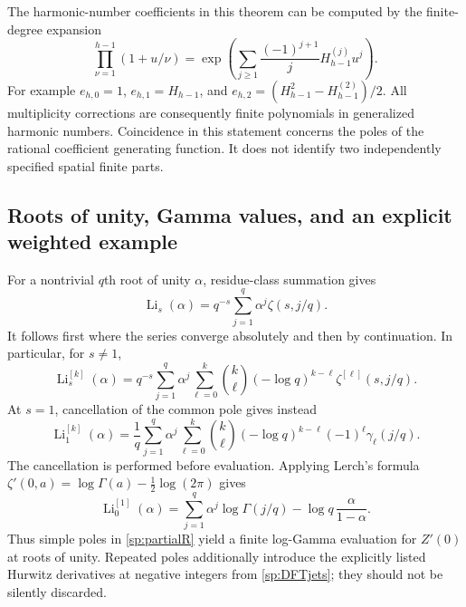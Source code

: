 \documentclass[11pt,a4paper]{article}
\theoremstyle{definition}
\theoremstyle{remark}
\numberwithin{equation}{section}
\begin{document}
The harmonic-number coefficients in this theorem can be computed by
the finite-degree expansion
\begin{equation}\label{sp:harmonicexp}
 \prod_{\nu=1}^{h-1}(1+u/\nu)
 =\exp\!\left(
    \sum_{j\geq1}\frac{(-1)^{j+1}}j H_{h-1}^{(j)}u^j\right).
\end{equation}
For example $e_{h,0}=1$, $e_{h,1}=H_{h-1}$, and
$e_{h,2}=(H_{h-1}^2-H_{h-1}^{(2)})/2$.
All multiplicity corrections are consequently finite polynomials in
generalized harmonic numbers.  Coincidence in this statement concerns
the poles of the rational coefficient generating function.  It does
not identify two independently specified spatial finite parts.

\subsection{Roots of unity, Gamma values, and an explicit weighted example}

For a nontrivial $q$th root of unity $\alpha$, residue-class summation
gives
\begin{equation}\label{sp:DFT}
 \operatorname{Li}_s(\alpha)
   =q^{-s}\sum_{j=1}^q\alpha^j\zeta(s,j/q).
\end{equation}
It follows first where the series converge absolutely and then by
continuation.  In particular, for $s\ne1$,
\begin{equation}\label{sp:DFTjets}
 \operatorname{Li}_s^{[k]}(\alpha)
 =q^{-s}\sum_{j=1}^q\alpha^j
       \sum_{\ell=0}^k\binom{k}{\ell}(-\log q)^{k-\ell}
                 \zeta^{[\ell]}(s,j/q).
\end{equation}
At $s=1$, cancellation of the common pole gives instead
\begin{equation}\label{sp:DFTstieltjes}
 \operatorname{Li}_1^{[k]}(\alpha)
 =\frac1q\sum_{j=1}^q\alpha^j
       \sum_{\ell=0}^k\binom{k}{\ell}
        (-\log q)^{k-\ell}(-1)^\ell\gamma_\ell(j/q).
\end{equation}
The cancellation is performed before evaluation.  Applying Lerch's
formula $\zeta'(0,a)=\log\Gamma(a)-\tfrac12\log(2\pi)$
\cite[Eq.~25.11.18]{DLMFHzeta} gives
\begin{equation}\label{sp:Gammajet}
 \operatorname{Li}_0^{[1]}(\alpha)
   =\sum_{j=1}^q\alpha^j\log\Gamma(j/q)
       -\log q\,\frac{\alpha}{1-\alpha}.
\end{equation}
Thus simple poles in \eqref{sp:partialR} yield a finite log-Gamma
evaluation for $Z'(0)$ at roots of unity.  Repeated poles additionally
introduce the explicitly listed Hurwitz derivatives at negative
integers from \eqref{sp:DFTjets}; they should not be silently discarded.
\end{document}
